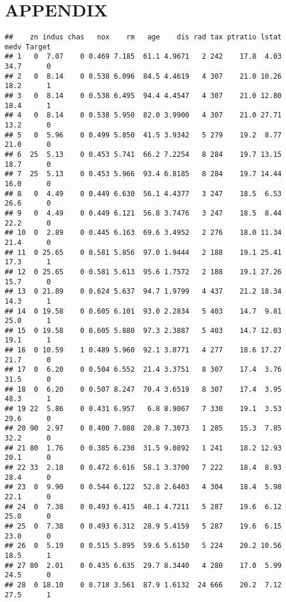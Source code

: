 \documentclass[
]{article}
\begin{document}
\hypertarget{appendix}{%
\section{APPENDIX}\label{appendix}}

\begin{verbatim}
##    zn indus chas   nox    rm   age    dis rad tax ptratio lstat medv Target
## 1   0  7.07    0 0.469 7.185  61.1 4.9671   2 242    17.8  4.03 34.7      0
## 2   0  8.14    0 0.538 6.096  84.5 4.4619   4 307    21.0 10.26 18.2      1
## 3   0  8.14    0 0.538 6.495  94.4 4.4547   4 307    21.0 12.80 18.4      1
## 4   0  8.14    0 0.538 5.950  82.0 3.9900   4 307    21.0 27.71 13.2      0
## 5   0  5.96    0 0.499 5.850  41.5 3.9342   5 279    19.2  8.77 21.0      0
## 6  25  5.13    0 0.453 5.741  66.2 7.2254   8 284    19.7 13.15 18.7      0
## 7  25  5.13    0 0.453 5.966  93.4 6.8185   8 284    19.7 14.44 16.0      0
## 8   0  4.49    0 0.449 6.630  56.1 4.4377   3 247    18.5  6.53 26.6      0
## 9   0  4.49    0 0.449 6.121  56.8 3.7476   3 247    18.5  8.44 22.2      0
## 10  0  2.89    0 0.445 6.163  69.6 3.4952   2 276    18.0 11.34 21.4      0
## 11  0 25.65    0 0.581 5.856  97.0 1.9444   2 188    19.1 25.41 17.3      1
## 12  0 25.65    0 0.581 5.613  95.6 1.7572   2 188    19.1 27.26 15.7      0
## 13  0 21.89    0 0.624 5.637  94.7 1.9799   4 437    21.2 18.34 14.3      1
## 14  0 19.58    0 0.605 6.101  93.0 2.2834   5 403    14.7  9.81 25.0      1
## 15  0 19.58    0 0.605 5.880  97.3 2.3887   5 403    14.7 12.03 19.1      1
## 16  0 10.59    1 0.489 5.960  92.1 3.8771   4 277    18.6 17.27 21.7      0
## 17  0  6.20    0 0.504 6.552  21.4 3.3751   8 307    17.4  3.76 31.5      0
## 18  0  6.20    0 0.507 8.247  70.4 3.6519   8 307    17.4  3.95 48.3      1
## 19 22  5.86    0 0.431 6.957   6.8 8.9067   7 330    19.1  3.53 29.6      0
## 20 90  2.97    0 0.400 7.088  20.8 7.3073   1 285    15.3  7.85 32.2      0
## 21 80  1.76    0 0.385 6.230  31.5 9.0892   1 241    18.2 12.93 20.1      0
## 22 33  2.18    0 0.472 6.616  58.1 3.3700   7 222    18.4  8.93 28.4      0
## 23  0  9.90    0 0.544 6.122  52.8 2.6403   4 304    18.4  5.98 22.1      0
## 24  0  7.38    0 0.493 6.415  40.1 4.7211   5 287    19.6  6.12 25.0      0
## 25  0  7.38    0 0.493 6.312  28.9 5.4159   5 287    19.6  6.15 23.0      0
## 26  0  5.19    0 0.515 5.895  59.6 5.6150   5 224    20.2 10.56 18.5      1
## 27 80  2.01    0 0.435 6.635  29.7 8.3440   4 280    17.0  5.99 24.5      0
## 28  0 18.10    0 0.718 3.561  87.9 1.6132  24 666    20.2  7.12 27.5      1

\end{verbatim}
\end{document}

